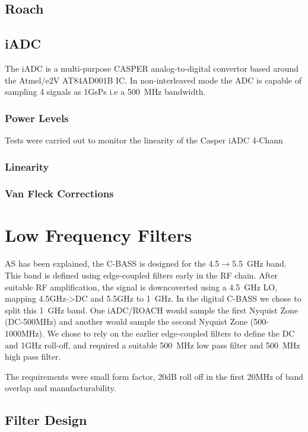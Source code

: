 \subsection{Roach}

\subsection{iADC}
The iADC is a multi-purpose CASPER analog-to-digital convertor based around the Atmel/e2V AT84AD001B IC. In non-interleaved mode the ADC is capable of sampling 4 signals as 1GsPs i.e a 500~MHz bandwidth. 

\subsubsection{Power Levels}
Tests were carried out to monitor the linearity of the Casper iADC 4-Chann

\subsubsection{Linearity}
\subsubsection{Van Fleck Corrections}

\section{Low Frequency Filters}
AS has been explained, the C-BASS is designed for the 4.5$\rightarrow$5.5~GHz band. This band is defined using edge-coupled filters early in the RF chain. After suitable RF amplification, the signal is downcoverted using a 4.5~GHz LO, mapping 4.5GHz->DC and 5.5GHz to 1~GHz.
In the digital C-BASS we chose to split this 1~GHz band. One iADC/ROACH would sample the first Nyquist Zone (DC-500MHz) and another would sample the second Nyquist Zone (500-1000MHz). We chose to rely on the earlier edge-coupled filters to define the DC and 1GHz roll-off, and required a suitable 500~MHz low pass filter and 500~MHz high pass filter. 

The requirements were small form factor, 20dB roll off in the first 20MHz of band overlap and manufacturability.


\subsection{Filter Design}
\label{sec:lowfreqFilters}

